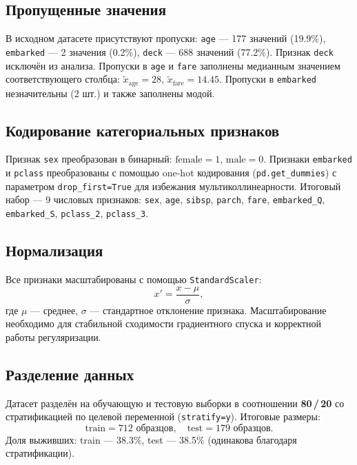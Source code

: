 \documentclass[12pt,a4paper]{article}
\begin{document}
\subsection{Пропущенные значения}

В исходном датасете присутствуют пропуски:
\texttt{age} — 177 значений (19.9\%), \texttt{embarked} — 2 значения (0.2\%),
\texttt{deck} — 688 значений (77.2\%). Признак \texttt{deck} исключён из
анализа. Пропуски в \texttt{age} и \texttt{fare} заполнены медианным
значением соответствующего столбца: \(\tilde{x}_{\text{age}} = 28\),
\(\tilde{x}_{\text{fare}} = 14.45\). Пропуски в \texttt{embarked}
незначительны (2 шт.) и также заполнены модой.

\subsection{Кодирование категориальных признаков}

Признак \texttt{sex} преобразован в бинарный:
\(\text{female} = 1\), \(\text{male} = 0\).
Признаки \texttt{embarked} и \texttt{pclass} преобразованы с помощью
one-hot кодирования (\texttt{pd.get\_dummies}) с параметром
\texttt{drop\_first=True} для избежания мультиколлинеарности.
Итоговый набор — 9 числовых признаков:
\texttt{sex}, \texttt{age}, \texttt{sibsp}, \texttt{parch},
\texttt{fare}, \texttt{embarked\_Q}, \texttt{embarked\_S},
\texttt{pclass\_2}, \texttt{pclass\_3}.

\subsection{Нормализация}

Все признаки масштабированы с помощью \texttt{StandardScaler}:
\[
x' = \frac{x - \mu}{\sigma},
\]
где \(\mu\) — среднее, \(\sigma\) — стандартное отклонение признака.
Масштабирование необходимо для стабильной сходимости градиентного
спуска и корректной работы регуляризации.

\subsection{Разделение данных}

Датасет разделён на обучающую и тестовую выборки в соотношении
\textbf{80\,/\,20} со стратификацией по целевой переменной
(\texttt{stratify=y}). Итоговые размеры:
\[
\text{train} = 712 \text{ образцов},\quad \text{test} = 179 \text{ образцов}.
\]
Доля выживших: train — 38.3\%, test — 38.5\% (одинакова благодаря
стратификации).
\end{document}
